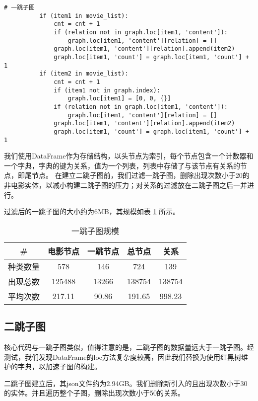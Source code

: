\documentclass{ctexart}
\begin{document}
\begin{sloppypar}
\begin{lstlisting}[style=Python]
          # 一跳子图
          if (item1 in movie_list):
              cnt = cnt + 1
              if (relation not in graph.loc[item1, 'content']):
                  graph.loc[item1, 'content'][relation] = []
              graph.loc[item1, 'content'][relation].append(item2)
              graph.loc[item1, 'count'] = graph.loc[item1, 'count'] + 1
          if (item2 in movie_list):
              cnt = cnt + 1
              if (item1 not in graph.index):
                  graph.loc[item1] = [0, 0, {}]
              if (relation not in graph.loc[item1, 'content']):
                  graph.loc[item1, 'content'][relation] = []
              graph.loc[item1, 'content'][relation].append(item2)
              graph.loc[item1, 'count'] = graph.loc[item1, 'count'] + 1
\end{lstlisting}

    我们使用DataFrame作为存储结构，以头节点为索引，每个节点包含一个计数器和一个字典，字典的键为关系，值为一个列表，列表中存储了与该节点有关系的节点，即尾节点。
    在建立二跳子图前，我们过滤一跳子图，删除出现次数小于20的非电影实体，以减小构建二跳子图的压力；对关系的过滤放在二跳子图之后一并进行。

    过滤后的一跳子图的大小约为6MB，其规模如表 \ref{tab:0} 所示。

    \begin{table}[h]
        \centering
        \caption{一跳子图规模\label{tab:0}}
        \begin{tabular}{ccccc}
            \toprule
            \#       & 电影节点 & 一跳节点 & 总节点 & 关系   \\ \midrule
            种类数量 & 578      & 146      & 724    & 139    \\
            出现总数 & 125488   & 13266    & 138754 & 138754 \\
            平均次数 & 217.11   & 90.86    & 191.65 & 998.23 \\
            \bottomrule
        \end{tabular}
    \end{table}

    \subsection{二跳子图}
    核心代码与一跳子图类似，值得注意的是，二跳子图的数据量远大于一跳子图。经测试，我们发现DataFrame的loc方法复杂度较高，因此我们替换为使用红黑树维护的字典，以加速子图的构建。

    二跳子图建立后，其json文件约为2.94GB。我们删除新引入的且出现次数小于30的实体。并且遍历整个子图，删除出现次数小于50的关系。


\end{sloppypar}
\end{document}
